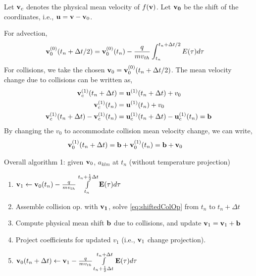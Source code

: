 \documentclass{article}[draft]
\begin{document}
Let $\mathbf{v}_c$ denotes the physical mean velocity of $f(\mathbf{v})$. Let $\mathbf{v_0}$ be the shift of the coordinates, i.e., $\mathbf{u}=\mathbf{v}-\mathbf{v}_0$.

For advection, 
\begin{align*}
	\mathbf{v}_0^{(0)}(t_n+ \Delta t/2) &=\mathbf{v}_0^{(0)}(t_n) -\frac{q}{mv_{th}} \int_{t_n}^{t_n + \Delta t/2} E(\tau) d\tau
\end{align*}
For collisions, we take the chosen $\mathbf{v}_0 = \mathbf{v}_0^{(0)}(t_n + \Delta t/2)$. The mean velocity change due to collisions can be written as, 
\begin{align*}
\mathbf{v}_c^{(1)} (t_n + \Delta t) &= \mathbf{u}^{(1)}(t_n + \Delta t) + v_0 \\
\mathbf{v}_c^{(1)} (t_n) &= \mathbf{u}^{(1)}(t_n) + v_0 \\
\mathbf{v}_c^{(1)} (t_n + \Delta t) - \mathbf{v}_c^{(1)} (t_n) &= \mathbf{u}_c^{(1)}(t_n + \Delta t) -\mathbf{u}_c^{(1)}(t_n) = \mathbf{b}\\
\end{align*}
By changing the $v_0$ to accommodate collision mean velocity change, we can write, 
\begin{align*}
\mathbf{v}_0^{(1)}(t_n + \Delta t) &= \mathbf{b} + \mathbf{v}_0^{(1)}(t_n) = \mathbf{b} + \mathbf{v}_0 
\end{align*} 


Overall algorithm 1: given $\mathbf{v}_0$, $a_{klm}$ at $t_n$ (without temperature projection)
\begin{enumerate}
\item $\vect{v}_1 \leftarrow \vect{v}_0(t_n) - \frac{q}{m v_{th}} \myint_{t_n}^{t_n+\frac12 \Delta t} \vect{E}\of{\tau} d\tau$
\item Assemble collision op. with $\mathbf{v_1}$, solve \eqref{eq:shiftedColOp} from $t_n$ to $t_n + \Delta t$
\item Compute physical mean shift $\mathbf{b}$ due to collisions, and update $\mathbf{v}_1=\mathbf{v}_1+\mathbf{b}$
\item Project coefficients for updated $v_1$ (i.e., $\mathbf{v}_1$ change projection).
\item $\vect{v}_0(t_n + \Delta t) \leftarrow \vect{v}_1 - \frac{q}{m v_{th}} \myint_{t_n+\frac12 \Delta t}^{t_n + \Delta t} \vect{E}\of{\tau} d\tau$
\end{enumerate}
\end{document}
